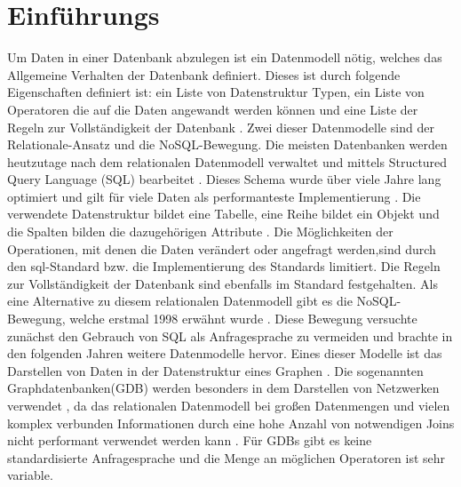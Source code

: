 
\chapter{Einführungs} %

\label{Kaptiel1} %


\newcommand{\keyword}[1]{\textit{#1}}
\newcommand{\tabhead}[1]{\textbf{#1}}
\newcommand{\code}[1]{\texttt{#1}}
\newcommand{\file}[1]{\texttt{\bfseries#1}}
\newcommand{\option}[1]{\texttt{\itshape#1}}

Um Daten in einer Datenbank abzulegen ist ein Datenmodell nötig, welches  das Allgemeine Verhalten der Datenbank definiert. Dieses ist durch folgende Eigenschaften definiert ist: ein Liste von Datenstruktur Typen, ein Liste von Operatoren die auf die Daten angewandt werden können und eine Liste der Regeln zur Vollständigkeit der Datenbank \parencite{codd1981data}. Zwei dieser Datenmodelle sind der Relationale-Ansatz und die NoSQL-Bewegung. Die meisten Datenbanken werden heutzutage nach dem relationalen Datenmodell verwaltet und mittels Structured Query Language (SQL) bearbeitet \parencite{miller2013graph}. Dieses Schema wurde über viele Jahre lang optimiert und gilt für viele Daten als performanteste Implementierung \parencite{miller2013graph}. Die verwendete Datenstruktur bildet eine Tabelle, eine Reihe bildet ein Objekt und die Spalten bilden die dazugehörigen Attribute \parencite{miller2013graph}. Die Möglichkeiten der Operationen, mit denen die Daten verändert oder angefragt werden,sind durch den sql-Standard bzw. die Implementierung des  Standards limitiert. Die Regeln zur Vollständigkeit der Datenbank sind ebenfalls im Standard festgehalten. \newline 
Als eine Alternative zu diesem relationalen Datenmodell gibt es die NoSQL-Bewegung, welche erstmal 1998 erwähnt wurde \parencite{strauch2011nosql}. Diese Bewegung versuchte zunächst den Gebrauch von SQL als Anfragesprache zu vermeiden und brachte in den folgenden Jahren weitere Datenmodelle hervor. Eines dieser Modelle ist das Darstellen von Daten in der Datenstruktur eines Graphen \parencite{miller2013graph}. Die sogenannten Graphdatenbanken(GDB) werden besonders in dem Darstellen von Netzwerken verwendet \parencite{han2011survey}, da das relationalen Datenmodell bei großen Datenmengen und vielen komplex verbunden Informationen durch eine hohe Anzahl von notwendigen Joins nicht performant verwendet werden kann \parencite{miller2013graph}. Für GDBs gibt es keine standardisierte Anfragesprache und  die Menge an möglichen Operatoren ist sehr variable.  \newline
